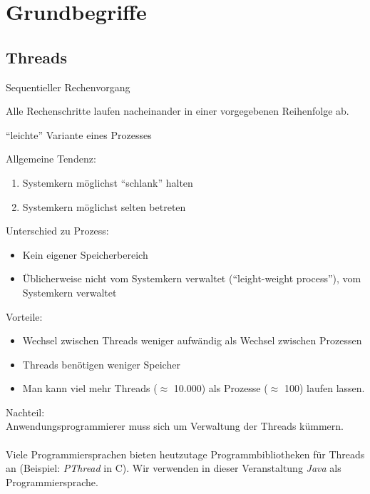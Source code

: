 \chapter{Grundbegriffe}

\section{Threads}

\begin{definition}[Prozess]
Sequentieller Rechenvorgang
\end{definition}

\begin{definition}[sequentiell]
Alle Rechenschritte laufen nacheinander in einer vorgegebenen Reihenfolge ab.
\end{definition}

\begin{definition}[Thread]
"`leichte"' Variante eines Prozesses
\end{definition}

Allgemeine Tendenz:
\begin{enumerate}
\item Systemkern möglichst "`schlank"' halten
\item Systemkern möglichst selten betreten
\end{enumerate}

Unterschied zu Prozess:
\begin{itemize}
\item Kein eigener Speicherbereich
\item Üblicherweise nicht vom Systemkern verwaltet ("`leight-weight process"'), vom Systemkern verwaltet
\end{itemize}

Vorteile:
\begin{itemize}
\item Wechsel zwischen Threads weniger aufwändig als Wechsel zwischen Prozessen
\item Threads benötigen weniger Speicher
\item Man kann viel mehr Threads ($\approx$ 10.000) als Prozesse ($\approx$ 100) laufen lassen.
\end{itemize}

Nachteil:\\
Anwendungsprogrammierer muss sich um Verwaltung der Threads kümmern.\\
\\
Viele Programmiersprachen bieten heutzutage Programmbibliotheken für Threads an (Beispiel: \emph{PThread} in C). Wir verwenden in dieser Veranstaltung \emph{Java} als Programmiersprache.


